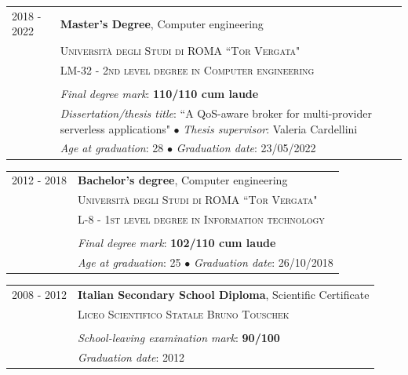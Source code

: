 \documentclass[english,10pt,a4paper]{article}
\newcommand{\CvEducation}[2]{ {\small \textit{#1}: #2}}
\newcommand{\CvBullet}{\hspace{0.05cm} $\bullet$ \hspace{0.05cm}}
\newcommand{\CvTimeRange}[2]{\textcolor{CvColor}{\textsc{#1 - #2}}}
\def\SidebarHSize{3.5cm}
\def\BodyHSize{11cm}
\begin{document}
	\begin{longtable}{p{\SidebarHSize}|p{\BodyHSize}}
		\CvTimeRange{2018}{2022} & \textbf{Master’s Degree}, Computer engineering \\
		& \textsc{Università degli Studi di ROMA ``Tor Vergata"} \\
		& \textsc{LM-32 - 2nd level degree in Computer engineering}\\
		& \\
		& \CvEducation{Final degree mark}{\textbf{110/110 cum laude}} \\
		& \CvEducation{Dissertation/thesis title}{``A QoS-aware broker for multi-provider serverless applications"} \CvBullet \CvEducation{Thesis supervisor}{Valeria Cardellini} \\
		& \CvEducation{Age at graduation}{28} \CvBullet \CvEducation{Graduation date}{23/05/2022}	
	\end{longtable}
	
	\begin{longtable}{p{\SidebarHSize}|p{\BodyHSize}}
		\CvTimeRange{2012}{2018} & \textbf{Bachelor's degree}, Computer engineering \\
		& \textsc{Università degli Studi di ROMA ``Tor Vergata"} \\
		& \textsc{L-8 - 1st level degree in Information technology}\\
		& \\
		& \CvEducation{Final degree mark}{\textbf{102/110 cum laude}} \\	
		& \CvEducation{Age at graduation}{25} \CvBullet \CvEducation{Graduation date}{26/10/2018}	
	\end{longtable}
		
	\begin{longtable}{p{\SidebarHSize}|p{\BodyHSize}}
		\CvTimeRange{2008}{2012} & \textbf{Italian Secondary School Diploma}, Scientific Certificate \\
		& \textsc{Liceo Scientifico Statale Bruno Touschek} \\	
		& \\
		& \CvEducation{School-leaving examination mark}{\textbf{90/100}} \\
		& \CvEducation{Graduation date}{2012}	
	\end{longtable}
\end{document}
